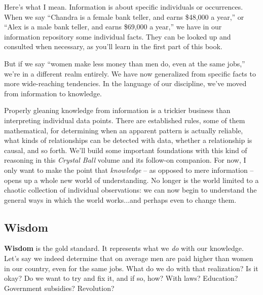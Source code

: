 
Here's what I mean. Information is about specific individuals or occurrences.
When we say ``Chandra is a female bank teller, and earns \$48,000 a year,'' or
``Alex is a male bank teller, and earns \$69,000 a year,'' we have in our
information repository some individual facts. They can be looked up and
consulted when necessary, as you'll learn in the first part of this book.

But if we say ``women make less money than men do, even at the same jobs,''
we're in a different realm entirely. We have now generalized from specific
facts to more wide-reaching tendencies. In the language of our discipline,
we've moved from information to knowledge.

Properly gleaning knowledge from information is a trickier business than
interpreting individual data points. There are established rules, some of them
mathematical, for determining when an apparent pattern is actually reliable,
what kinds of relationships can be detected with data, whether a relationship
is causal, and so forth. We'll build some important foundations with this kind
of reasoning in this \textit{Crystal Ball} volume and its follow-on companion.
For now, I only want to make the point that \textit{knowledge} -- as opposed to
mere information -- opens up a whole new world of understanding. No longer is
the world limited to a chaotic collection of individual observations: we can
now begin to understand the general ways in which the world works...and perhaps
even to change them.

\subsection{Wisdom}

\textbf{Wisdom} is the gold standard. It represents what we \textit{do} with
our knowledge. Let's say we indeed determine that on average men are paid
higher than women in our country, even for the same jobs. What do we do with
that realization? Is it okay? Do we want to try and fix it, and if so, how?
With laws? Education? Government subsidies? Revolution?


